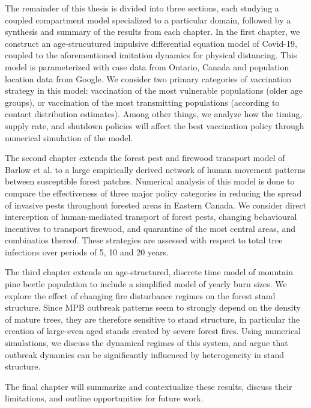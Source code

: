 The remainder of this thesis is divided into three sections, each studying a coupled compartment model specialized to a particular domain, followed by a synthesis and summary of the results from each chapter. In the first chapter, we construct an age-strucutured impulsive differential equation model of Covid-19, coupled to the aforementioned imitation dynamics for physical distancing. This model is parameterized with case data from Ontario, Canada and population location data from Google. We consider two primary categories of vaccination strategy in this model: vaccination of the most vulnerable populations (older age groups), or vaccination of the most transmitting populations (according to contact distribution estimates). Among other things, we analyze how the timing, supply rate, and shutdown policies will affect the best vaccination policy through numerical simulation of the model.

The second chapter extends the forest pest and firewood transport model of Barlow et al. \cite{barlow2014modelling} to a large empirically derived network of human movement patterns between susceptible forest patches. Numerical analysis of this model is done to compare the effectiveness of three major policy categories in reducing the spread of invasive pests throughout forested areas in Eastern Canada. We consider direct interception of human-mediated transport of forest pests, changing behavioural incentives to transport firewood, and quarantine of the most central areas, and combinatios thereof. These strategies are assessed with respect to total tree infections over periods of 5, 10 and 20 years.

The third chapter extends an age-structured, discrete time model of mountain pine beetle population \cite{duncan2015model} to include a simplified model of yearly burn sizes. We explore the effect of changing fire disturbance regimes on the forest stand structure. Since MPB outbreak patterns seem to strongly depend on the density of mature trees, they are therefore sensitive to stand structure, in particular the creation of large-even aged stands created by severe forest fires. Using numerical simulations, we discuss the dynamical regimes of this system, and argue that outbreak dynamics can be significantly influenced by heterogeneity in stand structure. 

The final chapter will summarize and contextualize these results, discuss their limitations, and outline opportunities for future work.
